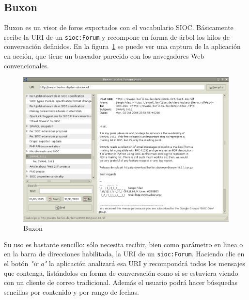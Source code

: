 \subsection*{Buxon}

Buxon es un visor de foros exportados con el vocabulario SIOC. Básicamente 
recibe la URI de un \texttt{sioc:Forum} y recompone en forma de árbol los
hilos de conversación definidos. En la figura~\ref{fig:buxon} se puede ver
una captura de la aplicación en acción, que tiene un buscador parecido con 
los navegadores Web convencionales.

\begin{figure}[H]
	\centering
	\includegraphics[width=16cm]{images/screenshots/buxon.png}
	\caption{Buxon}
	\label{fig:buxon}
\end{figure}

Su uso es bastante sencillo: sólo necesita recibir, bien como parámetro en linea
o en la barra de direcciones habilitada, la URI de un \texttt{sioc:Forum}.
Haciendo clic en el botón \textit{"ir a"} la aplicación analizará esa URI y recompondrá
todos los mensajes que contenga, listándolos en forma de conversación como si se estuviera
viendo con un cliente de correo tradicional. Además el usuario podrá hacer búsquedas
sencillas por contenido y por rango de fechas.
